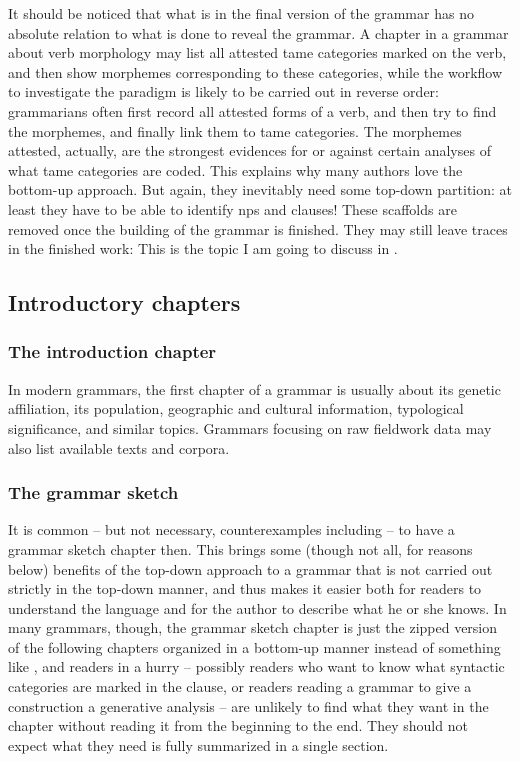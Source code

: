 \documentclass[UTF8, a4paper, oneside, scheme=plain]{ctexart}
\begin{document}
It should be noticed that what is in the final version of the grammar 
has no absolute relation to what is done to reveal the grammar.
A chapter in a grammar about verb morphology 
may list all attested \ac{tame} categories marked on the verb,
and then show morphemes corresponding to these categories,
while the workflow to investigate the paradigm 
is likely to be carried out in reverse order:
grammarians often first record all attested forms of a verb,
and then try to find the morphemes,
and finally link them to \ac{tame} categories.
The morphemes attested, actually, 
are the strongest evidences for or against certain analyses of 
what \ac{tame} categories are coded.
This explains why many authors love the bottom-up approach.
But again, they inevitably need some top-down partition:
at least they have to be able to identify \ac{np}s and clauses!
These scaffolds are removed once the building of the grammar is finished.
They may still leave traces in the finished work:
This is the topic I am going to discuss in .

\subsection{Introductory chapters}

\subsubsection{The introduction chapter}\label{sec:introduction-chapter}

In modern grammars, the first chapter of a grammar is usually about 
its genetic affiliation, its population, 
geographic and cultural information,
typological significance, and similar topics.
Grammars focusing on raw fieldwork data 
may also list available texts and corpora.

\subsubsection{The grammar sketch}\label{sec:grammar-sketch}

It is common -- but not necessary, counterexamples including \citet{Grimm2021} 
-- to have a grammar sketch chapter then.
This brings some (though not all, for reasons below) benefits of the top-down approach
to a grammar that is not carried out strictly in the top-down manner,
and thus makes it easier both for readers to understand the language 
and for the author to describe what he or she knows.
In many grammars, though, the grammar sketch chapter is just 
the zipped version of the following chapters organized in a bottom-up manner
instead of something like ,
and readers in a hurry 
-- possibly readers who want to know what syntactic categories are marked in the clause,
or readers reading a grammar to give a construction a generative analysis  --
are unlikely to find what they want in the chapter without reading it from the beginning to the end.
They should not expect what they need is fully summarized in a single section.
\end{document}
